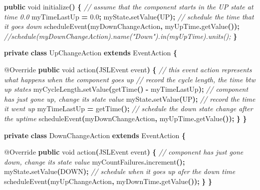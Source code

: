 \documentclass[
]{book}
\newenvironment{Shaded}{\begin{snugshade}}{\end{snugshade}}
\newcommand{\AttributeTok}[1]{\textcolor[rgb]{0.77,0.63,0.00}{#1}}
\newcommand{\CommentTok}[1]{\textcolor[rgb]{0.56,0.35,0.01}{\textit{#1}}}
\newcommand{\DataTypeTok}[1]{\textcolor[rgb]{0.13,0.29,0.53}{#1}}
\newcommand{\FloatTok}[1]{\textcolor[rgb]{0.00,0.00,0.81}{#1}}
\newcommand{\FunctionTok}[1]{\textcolor[rgb]{0.00,0.00,0.00}{#1}}
\newcommand{\KeywordTok}[1]{\textcolor[rgb]{0.13,0.29,0.53}{\textbf{#1}}}
\newcommand{\NormalTok}[1]{#1}
\newcommand{\OperatorTok}[1]{\textcolor[rgb]{0.81,0.36,0.00}{\textbf{#1}}}
\theoremstyle{definition}
\theoremstyle{definition}
\theoremstyle{definition}
\theoremstyle{definition}
\theoremstyle{remark}
\begin{document}
\begin{Shaded}
\begin{Highlighting}[]
\KeywordTok{public} \DataTypeTok{void} \FunctionTok{initialize}\OperatorTok{()} \OperatorTok{\{}
    \CommentTok{// assume that the component starts in the UP state at time 0.0}
\NormalTok{    myTimeLastUp }\OperatorTok{=} \FloatTok{0.0}\OperatorTok{;}
\NormalTok{    myState}\OperatorTok{.}\FunctionTok{setValue}\OperatorTok{(}\NormalTok{UP}\OperatorTok{);}
    \CommentTok{// schedule the time that it goes down}
    \FunctionTok{scheduleEvent}\OperatorTok{(}\NormalTok{myDownChangeAction}\OperatorTok{,}\NormalTok{ myUpTime}\OperatorTok{.}\FunctionTok{getValue}\OperatorTok{());}
    \CommentTok{//schedule(myDownChangeAction).name("Down").in(myUpTime).units();}
\OperatorTok{\}}

\KeywordTok{private} \KeywordTok{class}\NormalTok{ UpChangeAction }\KeywordTok{extends}\NormalTok{ EventAction }\OperatorTok{\{}

    \AttributeTok{@Override}
    \KeywordTok{public} \DataTypeTok{void} \FunctionTok{action}\OperatorTok{(}\NormalTok{JSLEvent event}\OperatorTok{)} \OperatorTok{\{}
        \CommentTok{// this event action represents what happens when the component goes up}
        \CommentTok{// record the cycle length, the time btw up states}
\NormalTok{        myCycleLength}\OperatorTok{.}\FunctionTok{setValue}\OperatorTok{(}\FunctionTok{getTime}\OperatorTok{()} \OperatorTok{{-}}\NormalTok{ myTimeLastUp}\OperatorTok{);}
        \CommentTok{// component has just gone up, change its state value}
\NormalTok{        myState}\OperatorTok{.}\FunctionTok{setValue}\OperatorTok{(}\NormalTok{UP}\OperatorTok{);}
        \CommentTok{// record the time it went up}
\NormalTok{        myTimeLastUp }\OperatorTok{=} \FunctionTok{getTime}\OperatorTok{();}
        \CommentTok{// schedule the down state change after the uptime}
        \FunctionTok{scheduleEvent}\OperatorTok{(}\NormalTok{myDownChangeAction}\OperatorTok{,}\NormalTok{ myUpTime}\OperatorTok{.}\FunctionTok{getValue}\OperatorTok{());}
    \OperatorTok{\}}
\OperatorTok{\}}

\KeywordTok{private} \KeywordTok{class}\NormalTok{ DownChangeAction }\KeywordTok{extends}\NormalTok{ EventAction }\OperatorTok{\{}

    \AttributeTok{@Override}
    \KeywordTok{public} \DataTypeTok{void} \FunctionTok{action}\OperatorTok{(}\NormalTok{JSLEvent event}\OperatorTok{)} \OperatorTok{\{}
        \CommentTok{// component has just gone down, change its state value}
\NormalTok{        myCountFailures}\OperatorTok{.}\FunctionTok{increment}\OperatorTok{();}
\NormalTok{        myState}\OperatorTok{.}\FunctionTok{setValue}\OperatorTok{(}\NormalTok{DOWN}\OperatorTok{);}
        \CommentTok{// schedule when it goes up afer the down time}
        \FunctionTok{scheduleEvent}\OperatorTok{(}\NormalTok{myUpChangeAction}\OperatorTok{,}\NormalTok{ myDownTime}\OperatorTok{.}\FunctionTok{getValue}\OperatorTok{());}
    \OperatorTok{\}}
\OperatorTok{\}}
\end{Highlighting}
\end{Shaded}
\end{document}
